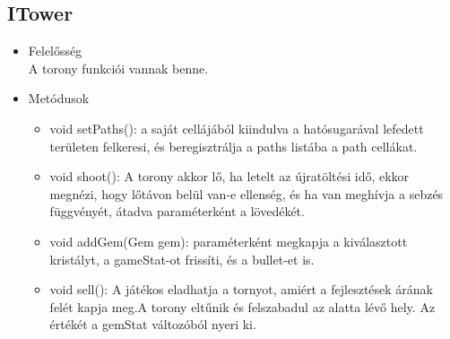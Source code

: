 \subsection{ITower}
\begin{itemize}
\item Felelősség\\
A torony funkciói vannak benne.
\item Metódusok\\
	\begin{itemize}
		\item void setPaths(): a saját cellájából kiindulva a hatósugarával lefedett területen felkeresi, és beregisztrálja a paths listába a path cellákat.
		\item void shoot(): A torony akkor lő, ha letelt az újratöltési idő, ekkor megnézi, hogy lőtávon belül van-e ellenség, és ha van meghívja a sebzés függvényét, átadva paraméterként a lövedékét. 
		\item void addGem(Gem gem): paraméterként megkapja a kiválasztott kristályt, a gameStat-ot frissíti, és a bullet-et is.
		\item void sell(): A játékos eladhatja a tornyot, amiért a fejlesztések árának felét kapja meg.A torony eltűnik és felszabadul az alatta lévő hely. Az értékét a gemStat változóból 	nyeri ki.
		
		
	\end{itemize}
\end{itemize}

